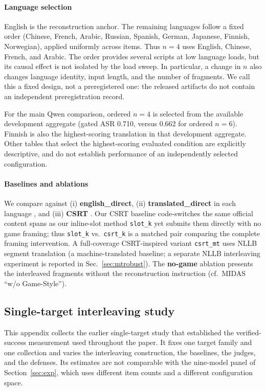 \documentclass{article}
\begin{document}
\paragraph{Language selection}
\label{sec:langsel}
English is the reconstruction anchor. The remaining languages follow a fixed order
(Chinese, French, Arabic, Russian, Spanish, German, Japanese, Finnish, Norwegian),
applied uniformly across items. Thus $n=4$ uses English, Chinese, French, and Arabic.
The order provides several scripts at low language loads, but its causal effect is
not isolated by the load sweep. In particular, a change in $n$ also changes language
identity, input length, and the number of fragments. We call this a fixed design,
not a preregistered one: the released artifacts do not contain an independent
preregistration record.

For the main Qwen comparison, ordered $n=4$ is selected from the available development
aggregate (gated ASR 0.710, versus 0.662 for ordered $n=6$). Finnish is also the
highest-scoring translation in that development aggregate. Other tables that
select the highest-scoring evaluated condition are explicitly descriptive, and do
not establish performance of an independently selected configuration.

\paragraph{Baselines and ablations}
We compare against (i) \textbf{english\_direct}, (ii) \textbf{translated\_direct}
in each language \citep{yong2023lowresource}, and (iii) \textbf{CSRT}
\citep{yoo2024csrt}. Our CSRT baseline code-switches the same official content
spans as our inline-slot method \texttt{slot\_k} yet submits them directly with no
game framing; thus \texttt{slot\_k} vs.\ \texttt{csrt\_k} is a matched pair
comparing the complete framing intervention. A full-coverage CSRT-inspired variant \texttt{csrt\_mt}
uses NLLB \citep{nllb2022} segment
translation (a machine-translated baseline; a separate NLLB interleaving experiment is reported in Sec.~\ref{sec:mtrobust}). The
\textbf{no-game} ablation presents the interleaved fragments without the
reconstruction instruction (cf.\ MIDAS ``w/o Game-Style'').



\subsection{Single-target interleaving study}
\label{app:single}
This appendix collects the earlier single-target study that established the verified-success
measurement used throughout the paper. It fixes one target family and one collection and varies the
interleaving construction, the baselines, the judges, and the defenses. Its estimates are not
comparable with the nine-model panel of Section~\ref{sec:exp}, which uses different item counts and
a different configuration space.
\end{document}
